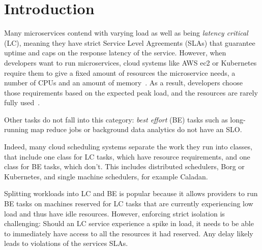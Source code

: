 \section{Introduction}
\label{s:intro}

Many microservices contend with varying load as well as being \textit{latency
critical} (LC), meaning they have strict Service Level Agreements (SLAs) that
guarantee uptime and caps on the response latency of the service. However, when
developers want to run microservices, cloud systems like AWS ec2 or Kubernetes
require them to give a fixed amount of resources the microservice needs, \ie{} a
number of CPUs and an amount of memory~\cite{aws-ec2-resources,
kubernetes-resources}. As a result, developers choose those requirements based
on the expected peak load, and the resources are rarely fully used~\cite{borg,
nu, overprovision}.

Other tasks do not fall into this category: \textit{best effort} (BE) tasks such
as long-running map reduce jobs or background data analytics do not have an SLO.

Indeed, many cloud scheduling systems separate the work they run into classes,
that include one class for LC tasks, which have resource requirements, and one
class for BE tasks, which don't. This includes distributed schedulers, \eg{}
Borg\cite{borg} or Kubernetes\cite{kubernetes-resources}, and single machine
schedulers, for example Caladan\cite{caladan}.

Splitting workloads into LC and BE is popular because it allows providers to run
BE tasks on machines reserved for LC tasks that are currently experiencing low
load and thus have idle resources. However, enforcing strict isolation is
challenging: Should an LC service experience a spike in load, it needs to be
able to immediately have access to all the resources it had reserved. Any delay
likely leads to violations of the services SLAs.

